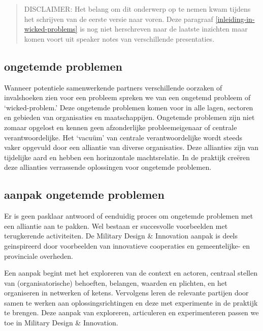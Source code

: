 \documentclass[
]{book}
\begin{document}
\begin{quote}
DISCLAIMER: Het belang om dit onderwerp op te nemen kwam tijdens het schrijven van de eerste versie naar voren. Deze paragraaf \ref{inleiding-in-wicked-problems} is nog niet herschreven naar de laatste inzichten maar komen voort uit speaker notes van verschillende presentaties.
\end{quote}

\hypertarget{ongetemde-problemen}{%
\subsection{ongetemde problemen}\label{ongetemde-problemen}}

Wanneer potentiele samenwerkende partners verschillende oorzaken of invalshoeken zien voor een probleem spreken we van een ongetemd probleem of `wicked-problem.' Deze ongetemde problemen komen voor in alle lagen, sectoren en gebieden van organisaties en maatschappijen. Ongetemde problemen zijn niet zomaar opgelost en kennen geen afzonderlijke probleemeigenaar of centrale verantwoordelijke. Het `vacuüm' van centrale verantwoordelijke wordt steeds vaker opgevuld door een alliantie van diverse organisaties. Deze allianties zijn van tijdelijke aard en hebben een horinzontale machtsrelatie. In de praktijk creëren deze allianties verrassende oplossingen voor ongetemde problemen.

\hypertarget{aanpak-ongetemde-problemen}{%
\subsection{aanpak ongetemde problemen}\label{aanpak-ongetemde-problemen}}

Er is geen pasklaar antwoord of eenduidig proces om ongetemde problemen met een alliantie aan te pakken. Wel bestaan er succesvolle voorbeelden met terugkerende activiteiten. De Military Design \& Innovation aanpak is deels geinspireerd door voorbeelden van innovatieve cooperaties en gemeentelijke- en provinciale overheden.

Een aanpak begint met het exploreren van de context en actoren, centraal stellen van (organisatorische) behoeften, belangen, waarden en plichten, en het organiseren in netwerken of ketens. Vervolgens leren de relevante partijen door samen te werken aan oplossingsrichtingen en deze met experimente in de praktijk te brengen. Deze aanpak van exploreren, articuleren en experimenteren passen we toe in Military Design \& Innovation.
\end{document}
